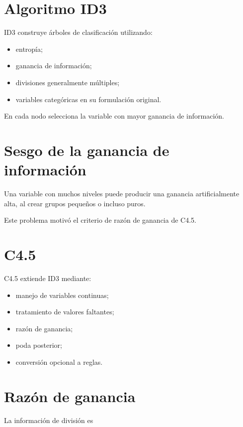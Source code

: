 \documentclass[
  spanish,
  11pt,
  letterpaper,
  DIV=11,
  numbers=noendperiod]{scrreprt}
\providecommand{\tightlist}{%
  \setlength{\itemsep}{0pt}\setlength{\parskip}{0pt}}
\theoremstyle{definition}
\theoremstyle{plain}
\theoremstyle{definition}
\theoremstyle{remark}
\begin{document}
\section{Algoritmo ID3}\label{algoritmo-id3}

ID3 construye árboles de clasificación utilizando:

\begin{itemize}
\tightlist
\item
  entropía;
\item
  ganancia de información;
\item
  divisiones generalmente múltiples;
\item
  variables categóricas en su formulación original.
\end{itemize}

En cada nodo selecciona la variable con mayor ganancia de información.

\section{Sesgo de la ganancia de
información}\label{sesgo-de-la-ganancia-de-informaciuxf3n}

Una variable con muchos niveles puede producir una ganancia
artificialmente alta, al crear grupos pequeños o incluso puros.

Este problema motivó el criterio de razón de ganancia de C4.5.

\section{C4.5}\label{c4.5}

C4.5 extiende ID3 mediante:

\begin{itemize}
\tightlist
\item
  manejo de variables continuas;
\item
  tratamiento de valores faltantes;
\item
  razón de ganancia;
\item
  poda posterior;
\item
  conversión opcional a reglas.
\end{itemize}

\section{Razón de ganancia}\label{razuxf3n-de-ganancia}

La información de división es
\end{document}
